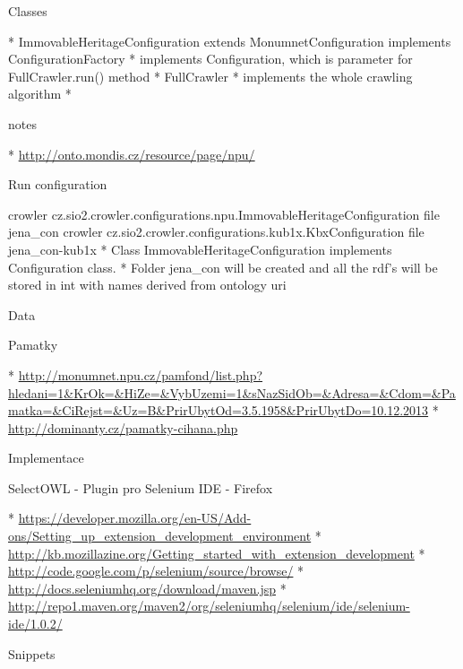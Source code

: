 \secc Classes

\begitems
  * ImmovableHeritageConfiguration extends MonumnetConfiguration implements ConfigurationFactory 
  \begitems
    * implements Configuration, which is parameter for FullCrawler.run() method
  \enditems
  * FullCrawler
  \begitems
    * implements the whole crawling algorithm
    * 
  \enditems
\enditems


\sec notes

\begitems
  * \url{http://onto.mondis.cz/resource/page/npu/}
\enditems

\secc Run configuration 

\begtt
crowler cz.sio2.crowler.configurations.npu.ImmovableHeritageConfiguration file jena_con
crowler cz.sio2.crowler.configurations.kub1x.KbxConfiguration file jena_con-kub1x
\endtt
\begitems
  * Class ImmovableHeritageConfiguration implements Configuration class. 
  * Folder jena\_con will be created and all the rdf's will be stored in int with names derived from ontology uri
\enditems


\chap Data

\sec Pamatky

\begitems
  * \url{http://monumnet.npu.cz/pamfond/list.php?hledani=1&KrOk=&HiZe=&VybUzemi=1&sNazSidOb=&Adresa=&Cdom=&Pamatka=&CiRejst=&Uz=B&PrirUbytOd=3.5.1958&PrirUbytDo=10.12.2013}
  * \url{http://dominanty.cz/pamatky-cihana.php}
\enditems


\chap Implementace

\sec SelectOWL - Plugin pro Selenium IDE - Firefox

\begitems
  * \url{https://developer.mozilla.org/en-US/Add-ons/Setting_up_extension_development_environment}
  * \url{http://kb.mozillazine.org/Getting_started_with_extension_development}
  * \url{http://code.google.com/p/selenium/source/browse/}
  * \url{http://docs.seleniumhq.org/download/maven.jsp}
  * \url{http://repo1.maven.org/maven2/org/seleniumhq/selenium/ide/selenium-ide/1.0.2/}
\enditems

\sec Snippets



\bye
